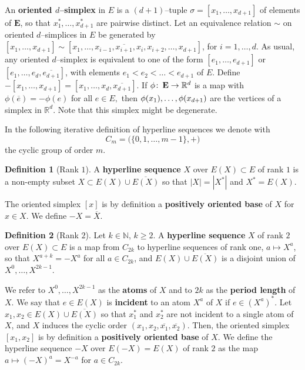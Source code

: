 \documentclass[a4paper]{amsart}
\def\co{\colon\thinspace}
\newcommand{\begriff}[1]{\textbf{#1}}
\theoremstyle{definition}
\newtheorem{definition}{Definition}
\theoremstyle{remark}
\begin{document}
An \begriff{oriented $d$--simplex} in $E$ is a 
$(d+1)$--tuple $\sigma = [x_1,\dots,x_{d+1}]$ of elements of $\mathbf E$,
so that $x_1^*,\dots, x_{d+1}^*$ are pairwise distinct. 
Let an equivalence relation $\sim$ on oriented $d$--simplices in $E$ be
generated by 
$[x_1,\dots,x_{d+1}]\sim [x_1,\dots, x_{i-1},\overline{x_{i+1}},x_i,
x_{i+2},\dots, x_{d+1}]$, for $i=1,\dots, d$. 
As usual, any oriented $d$--simplex is equivalent to one of
the form $[ e_1,\dots,  e_{d+1}]$ or $[ e_1,\dots,  e_{d},\overline{
  e_{d+1}}]$, with elements $e_1<e_2<\dots < e_{d+1}$ of $E$. 
Define $-[x_1,\dots,x_{d+1}] = [x_1,\dots,x_d,\overline{x_{d+1}}]$.
%
If $\phi\co \mathbf E\to \mathbb R^d$ is a
map with $\phi(\overline e) = -\phi(e)$ for all $e\in E,$ then
$\phi(x_1),\dots, \break \phi(x_{d+1})$ are the vertices of a simplex in
$\mathbb R^d$. Note that this simplex might be degenerate.

In the following iterative definition of hyperline sequences we denote
with $$C_m=\big(\{0,1,\dots, {m-1}\},+\big)$$
the cyclic group of
order $m$.
%
\begin{definition}[Rank $1$]
  A \begriff{hyperline sequence} $X$ over $E(X)\subset E$ of rank $1$
  is a non-empty subset $X\subset E(X)\cup \overline{E(X)}$ so that
  $|X| = |X^*|$ and $X^*=E(X)$. 
\end{definition}

The oriented simplex $[x]$ is by definition a
\begriff{positively oriented base} of $X$ for $x\in X$. 
We define $-X = \overline X$.

\begin{definition}[Rank $2$]
  Let $k\in \mathbb N$, $k\ge 2$.  A \begriff{hyperline sequence} $X$
  of rank $2$ over $E(X)\subset E$ is a map from $C_{2k}$ to hyperline
  sequences of rank one, $a\mapsto X^a$, so that $X^{a+k} =
  -X^a$ for all $a\in C_{2k}$, and $E(X)\cup\overline{E(X)}$
  is a disjoint union of $X^0,\dots, X^{2k-1}$.  
\end{definition}

We refer to $X^0,\dots, X^{2k-1}$ as the \begriff{atoms} of $X$ and
to $2k$ as the \begriff{period length} of $X$.
%  
We say that $e\in E(X)$ is \begriff{incident} to an atom $X^a$ of $X$
if $e\in (X^a)^*$. Let $x_1,x_2\in E(X)\cup \overline{E(X)}$ so that
$x_1^*$ and $x_2^*$ are not incident to a single atom of $X$, and $X$
induces the cyclic order
$(x_1,x_2,\overline{x_1},\overline{x_2})$. Then, the oriented simplex
$[x_1,x_2]$ is by definition a \begriff{positively oriented base} of
$X$.  
We define the hyperline sequence $-X$ over $E(-X)=E(X)$ of rank $2$ as
the map $a\mapsto (-X)^a = X^{-a}$ for $a\in C_{2k}$.  
\end{document}
